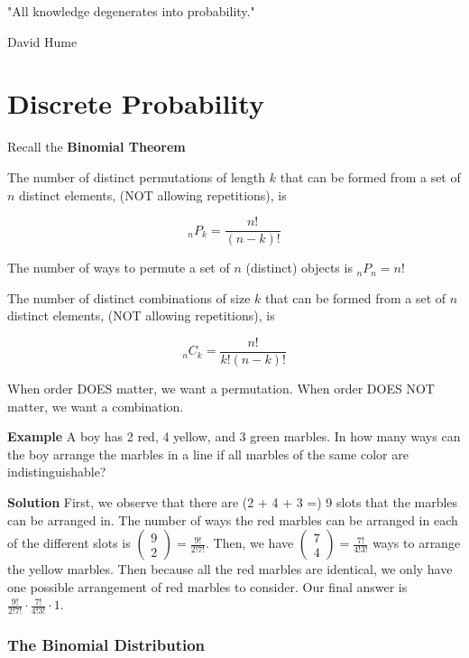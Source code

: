 
\usepackage{epigraph}



\epigraph{"All knowledge degenerates into probability."}{David Hume}

\section{Discrete Probability}

Recall the \textbf{Binomial Theorem}

The number of distinct permutations of length $k$ that can be formed from a set of $n$ distinct elements, (NOT allowing repetitions), is

$$_nP_k = \frac{n!}{(n-k)!}$$

The number of ways to permute a set of $n$ (distinct) objects is $_nP_n = n!$

The number of distinct combinations of size $k$ that can be formed from a set of $n$ distinct elements, (NOT allowing repetitions), is

$$_nC_k = \frac{n!}{k!(n-k)!}$$

When order DOES matter, we want a permutation. When order DOES NOT matter, we want a combination.

\textbf{Example} A boy has 2 red, 4 yellow, and 3 green marbles. In how many ways can the boy arrange the marbles in a line if all marbles of the same color are indistinguishable?

\textbf{Solution} First, we observe that there are (2 + 4 + 3 =) 9 slots that the marbles can be arranged in. The number of ways the red marbles can be arranged in each of the different slots is $\begin{pmatrix}
    9\\
    2
\end{pmatrix} = \frac{9!}{2!7!}$. Then, we have $\begin{pmatrix}
    7\\
    4
\end{pmatrix} = \frac{7!}{4!3!}$ ways to arrange the yellow marbles. Then because all the red marbles are identical, we only have one possible arrangement of red marbles to consider. Our final answer is $\frac{9!}{2!7!} \cdot \frac{7!}{4!3!} \cdot 1$.

\subsubsection{The Binomial Distribution}

